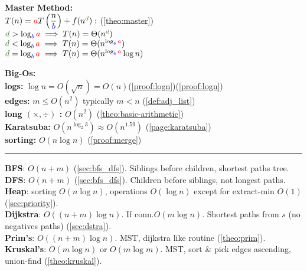 \begin{minipage}{0.45\textwidth}
\textbf{Master Method:}\\

\vspace{-.5em}
\noindent
$T(n) = \textcolor{red}{a}T\left(\dfrac{n}{\textcolor{blue}{b}}\right) + f(n^{\textcolor{OliveGreen}{d}}):$ (\ref{theo:master})\\
$\textcolor{OliveGreen}{d} > \log_{\textcolor{blue}{b}} \textcolor{red}{a} \implies T(n) = \Theta(n^{\textcolor{OliveGreen}{d}})$\\
$\textcolor{OliveGreen}{d} < \log_{\textcolor{blue}{b}} \textcolor{red}{a} \implies T(n) = \Theta(n^{\log_{\textcolor{blue}{b}} \textcolor{red}{a}})$\\
$\textcolor{OliveGreen}{d} = \log_{\textcolor{blue}{b}} \textcolor{red}{a} \implies T(n) = \Theta(n^{\log_{\textcolor{blue}{b}} \textcolor{red}{a}} \log n)$\\
\end{minipage}
\hfill
\begin{minipage}{0.45\textwidth}
\textbf{Big-Os:}\\
\textbf{logs:} $\log n = O(\sqrt{n}) = O(n)$(\ref{proof:logn})(\ref{proof:logn})\\
\textbf{edges:} $m \leq O(n^2)$ typically $m<n$ (\ref{def:adj_list})\\
\textbf{long $(\times,\div)$ :} $O(n^2)$ (\ref{theo:basic-arithmetic})\\
\textbf{Karatsuba:} $O(n^{\log_2 3})\approx O(n^{1.59})$ (\ref{page:karatsuba})\\
\textbf{sorting:} $O(n\log n)$ (\ref{proof:merge})\\
\end{minipage}
\noindent\rule{\textwidth}{0.4pt}
\textbf{BFS}: $O(n+m)$ (\ref{sec:bfs_dfs}). Siblings before children, shortest paths tree.\\
\textbf{DFS}: $O(n+m)$ (\ref{sec:bfs_dfs}). Children before siblings, not longest paths.\\
\textbf{Heap}: sorting $O(n\log n)$, operations $O(\log n)$ except for extract-min $O(1)$ (\ref{sec:priority}).\\
\textbf{Dijkstra}: $O((n+m)\log n)$. If conn.$O(m \log n)$. Shortest paths from $s$ (no negatives paths) (\ref{sec:dstra}).\\
\textbf{Prim's}: $O((n+m)\log n)$. MST, dijkstra like routine (\ref{theo:prim}).\\
\textbf{Kruskal's}: $O(m \log n)$ or $O(m \log m)$. MST, sort \& pick edges ascending, union-find (\ref{theo:kruskal}).\\
